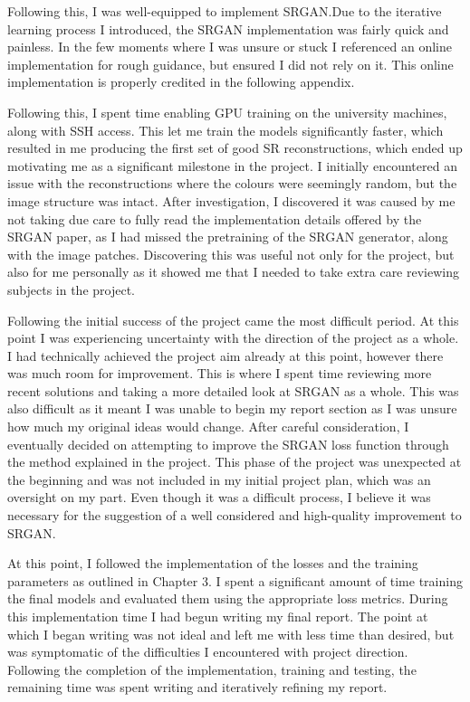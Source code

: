 \begin{appendices}
Following this, I was well-equipped to implement SRGAN.\@ Due to the iterative learning process I introduced, the SRGAN implementation was fairly quick and painless. In the few moments where I was unsure or stuck I referenced an online implementation for rough guidance, but ensured I did not rely on it. This online implementation is properly credited in the following appendix.

Following this, I spent time enabling GPU training on the university machines, along with SSH access. This let me train the models significantly faster, which resulted in me producing the first set of good SR reconstructions, which ended up motivating me as a significant milestone in the project. I initially encountered an issue with the reconstructions where the colours were seemingly random, but the image structure was intact. After investigation, I discovered it was caused by me not taking due care to fully read the implementation details offered by the SRGAN paper, as I had missed the pretraining of the SRGAN generator, along with the image patches. Discovering this was useful not only for the project, but also for me personally as it showed me that I needed to take extra care reviewing subjects in the project.

Following the initial success of the project came the most difficult period. At this point I was experiencing uncertainty with the direction of the project as a whole. I had technically achieved the project aim already at this point, however there was much room for improvement. This is where I spent time reviewing more recent solutions and taking a more detailed look at SRGAN as a whole. This was also difficult as it meant I was unable to begin my report section as I was unsure how much my original ideas would change. After careful consideration, I eventually decided on attempting to improve the SRGAN loss function through the method explained in the project. This phase of the project was unexpected at the beginning and was not included in my initial project plan, which was an oversight on my part. Even though it was a difficult process, I believe it was necessary for the suggestion of a well considered and high-quality improvement to SRGAN.\@

At this point, I followed the implementation of the losses and the training parameters as outlined in Chapter 3. I spent a significant amount of time training the final models and evaluated them using the appropriate loss metrics. During this implementation time I had begun writing my final report. The point at which I began writing was not ideal and left me with less time than desired, but was symptomatic of the difficulties I encountered with project direction. Following the completion of the implementation, training and testing, the remaining time was spent writing and iteratively refining my report.


\end{appendices}

